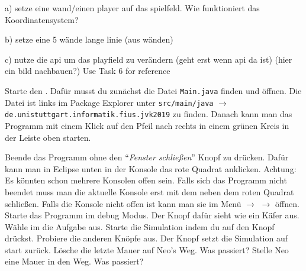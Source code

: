 


a) setze eine wand/einen player auf das spielfeld. Wie funktioniert das Koordinatensystem?

b) setze eine 5 wände lange linie (aus wänden)

c) nutze die api um das playfield zu verändern (geht erst wenn api da ist) (hier ein bild nachbauen?) Use Task 6 for reference





Starte den \simulator.
Dafür musst du zunächst die Datei \texttt{Main.java} finden und öffnen.
Die Datei ist links im Package Explorer unter \texttt{src/main/java} $\to$ \texttt{de.unistuttgart.informatik.fius.jvk2019} zu finden.
Danach kann man das Programm mit einem Klick auf den Pfeil nach rechts in einem grünen Kreis in der Leiste oben starten.


    \subexcercise Beende das Programm ohne den "`\textit{Fenster schließen}"' Knopf zu drücken.
        Dafür kann man in Eclipse unten in der Konsole das rote Quadrat anklicken.
        Achtung: Es könnten schon mehrere Konsolen offen sein.
        Falls sich das Programm nicht beendet muss man die aktuelle Konsole erst mit dem  neben dem roten Quadrat schließen.
        Falls die Konsole nicht offen ist kann man sie im Menü  $\to$  $\to$  öffnen.
    \subexcercise Starte das Programm im debug Modus.
        Der Knopf dafür sieht wie ein Käfer aus.
    \subexcercise Wähle im \simulator{} die Aufgabe  aus.
        Starte die Simulation indem du auf den  Knopf drückst.
        Probiere die anderen Knöpfe aus.
        Der  Knopf setzt die Simulation auf start zurück.
    \subexcercise Lösche die letzte Mauer auf Neo's Weg.
        Was passiert?
    \subexcercise Stelle Neo eine Mauer in den Weg.
        Was passiert?

